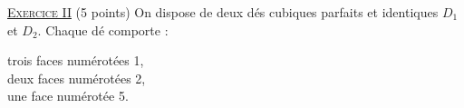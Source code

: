 \noindent \underline{\textsc{Exercice II}} (5 points) \newline
      On dispose de deux d\'es cubiques parfaits et identiques $D_1$ et $D_2$.
      Chaque d\'e comporte : 
            \begin{mitanisa}
                  \textbullet trois faces num\'erot\'ees 1, \\
                  \textbullet deux faces num\'erot\'ees 2, \\
                  \textbullet une face num\'erot\'ee 5.
            \end{mitanisa}
